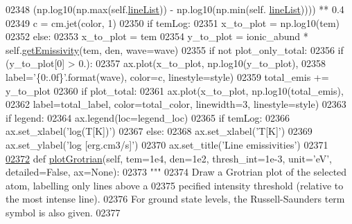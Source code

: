 \begin{DoxyCode}
{{{{{{{{{{{{{{{{{{{{{{02348                          (np.log10(np.max(self.\hyperlink{classpyneb_1_1core_1_1pynebcore_1_1_atom_a8280ef5632977a7cf7e8fe4c63127703}{lineList})) - np.log10(np.min(self.
      \hyperlink{classpyneb_1_1core_1_1pynebcore_1_1_atom_a8280ef5632977a7cf7e8fe4c63127703}{lineList})))) ** 0.4
02349                 c = cm.jet(color, 1)
02350                 \textcolor{keywordflow}{if} temLog:
02351                     x\_to\_plot = np.log10(tem)
02352                 \textcolor{keywordflow}{else}:
02353                     x\_to\_plot = tem
02354                 y\_to\_plot = ionic\_abund * self.\hyperlink{classpyneb_1_1core_1_1pynebcore_1_1_atom_aaf4e84a9d5f835e6284bd9302314f775}{getEmissivity}(tem, den, wave=wave)
02355                 \textcolor{keywordflow}{if} \textcolor{keywordflow}{not} plot\_only\_total:
02356                     \textcolor{keywordflow}{if} (y\_to\_plot[0] > 0.):
02357                         ax.plot(x\_to\_plot, np.log10(y\_to\_plot),
02358                              label=\textcolor{stringliteral}{'\{0:.0f\}'}.format(wave), color=c, linestyle=style)
02359                 total\_emis += y\_to\_plot
02360         \textcolor{keywordflow}{if} plot\_total:
02361             ax.plot(x\_to\_plot, np.log10(total\_emis),
02362                      label=total\_label, color=total\_color, linewidth=3, linestyle=style)
02363         \textcolor{keywordflow}{if} legend:
02364             ax.legend(loc=legend\_loc)
02365         \textcolor{keywordflow}{if} temLog:
02366             ax.set\_xlabel(\textcolor{stringliteral}{'log(T[K])'})
02367         \textcolor{keywordflow}{else}:
02368             ax.set\_xlabel(\textcolor{stringliteral}{'T[K]'})
02369         ax.set\_ylabel(\textcolor{stringliteral}{'log [erg.cm3/s]'})
02370         ax.set\_title(\textcolor{stringliteral}{'Line emissivities'})
02371 
\hypertarget{pynebcore_8py_source_l02372}{}\hyperlink{classpyneb_1_1core_1_1pynebcore_1_1_atom_ad18adec8faaf694fbff55656efea719d}{02372}     \textcolor{keyword}{def }\hyperlink{classpyneb_1_1core_1_1pynebcore_1_1_atom_ad18adec8faaf694fbff55656efea719d}{plotGrotrian}(self, tem=1e4, den=1e2, thresh\_int=1e-3, unit='eV', detailed=False, 
      ax=None):
02373         \textcolor{stringliteral}{"""}
02374 \textcolor{stringliteral}{        Draw a Grotrian plot of the selected atom, labelling only lines above a}
02375 \textcolor{stringliteral}{        pecified intensity threshold (relative to the most intense line). }
02376 \textcolor{stringliteral}{        For ground state levels, the Russell-Saunders term symbol is also given.}
02377 \textcolor{stringliteral}{        }
}}}}}}}}}}}}}}}}}}}}}}
\end{DoxyCode}
